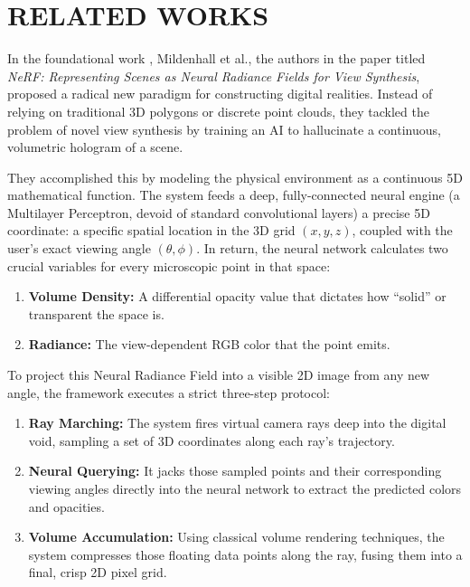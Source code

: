 \section{RELATED WORKS}
In the foundational work \cite{mildenhall2020nerf}, Mildenhall et al., the authors in the paper titled \textit{NeRF: Representing Scenes as Neural Radiance Fields for View Synthesis}, proposed a radical new paradigm for constructing digital realities. Instead of relying on traditional 3D polygons or discrete point clouds, they tackled the problem of novel view synthesis by training an AI to hallucinate a continuous, volumetric hologram of a scene.

They accomplished this by modeling the physical environment as a continuous 5D mathematical function. The system feeds a deep, fully-connected neural engine (a Multilayer Perceptron, devoid of standard convolutional layers) a precise 5D coordinate: a specific spatial location in the 3D grid $(x, y, z)$, coupled with the user's exact viewing angle $(\theta, \phi)$. In return, the neural network calculates two crucial variables for every microscopic point in that space:

\begin{enumerate}
    \item \textbf{Volume Density:} A differential opacity value that dictates how ``solid'' or transparent the space is.
    \item \textbf{Radiance:} The view-dependent RGB color that the point emits.
\end{enumerate}

To project this Neural Radiance Field into a visible 2D image from any new angle, the framework executes a strict three-step protocol:

\begin{enumerate}
    \item \textbf{Ray Marching:} The system fires virtual camera rays deep into the digital void, sampling a set of 3D coordinates along each ray's trajectory.
    \item \textbf{Neural Querying:} It jacks those sampled points and their corresponding viewing angles directly into the neural network to extract the predicted colors and opacities.
    \item \textbf{Volume Accumulation:} Using classical volume rendering techniques, the system compresses those floating data points along the ray, fusing them into a final, crisp 2D pixel grid.
\end{enumerate}

